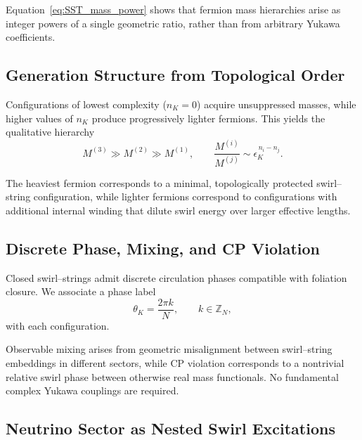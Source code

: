 \documentclass[11pt]{article}
\begin{document}
            Equation~\eqref{eq:SST_mass_power} shows that fermion mass hierarchies arise as integer
            powers of a single geometric ratio, rather than from arbitrary Yukawa coefficients.

        \subsection{Generation Structure from Topological Order}

            Configurations of lowest complexity ($n_K = 0$) acquire unsuppressed masses, while higher
            values of $n_K$ produce progressively lighter fermions. This yields the qualitative
            hierarchy
            \begin{equation}
                M^{(3)} \gg M^{(2)} \gg M^{(1)}, \qquad
                \frac{M^{(i)}}{M^{(j)}} \sim \epsilon_K^{\,n_i-n_j}.
            \end{equation}

            The heaviest fermion corresponds to a minimal, topologically protected swirl--string
            configuration, while lighter fermions correspond to configurations with additional
            internal winding that dilute swirl energy over larger effective lengths.

        \subsection{Discrete Phase, Mixing, and CP Violation}

            Closed swirl--strings admit discrete circulation phases compatible with foliation
            closure. We associate a phase label
            \begin{equation}
                \theta_K = \frac{2\pi k}{N}, \qquad k \in \mathbb{Z}_N ,
            \end{equation}
            with each configuration.

            Observable mixing arises from geometric misalignment between swirl--string embeddings in
            different sectors, while CP violation corresponds to a nontrivial relative swirl phase
            between otherwise real mass functionals. No fundamental complex Yukawa couplings are
            required.

        \subsection{Neutrino Sector as Nested Swirl Excitations}
\end{document}
